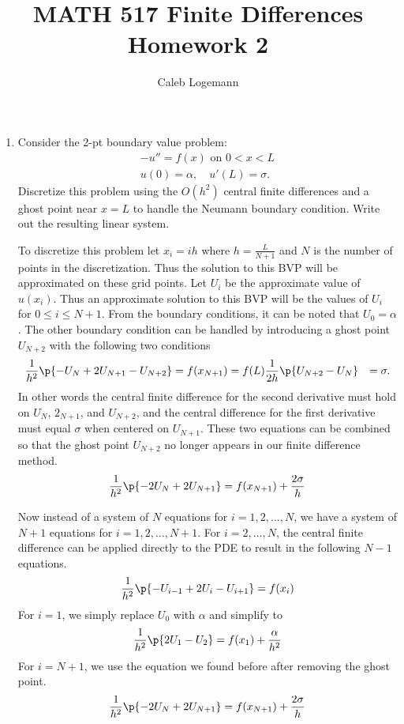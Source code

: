 \documentclass[11pt, oneside, titlepage]{article}
\title{MATH 517 Finite Differences Homework 2}
\author{Caleb Logemann}
\begin{document}
\maketitle

%
\begin{enumerate}
    \item %
        Consider the 2-pt boundary value problem:
        \begin{align*}
            -u'' = f(x)\text{ on } 0 < x < L \\
            u(0) = \alpha, \quad u'(L) = \sigma.
        \end{align*}
        Discretize this problem using the $O(h^2)$ central finite differences
        and a ghost point near $x = L$ to handle the Neumann boundary condition.
        Write out the resulting linear system.

        To discretize this problem let $x_i = ih$ where $h = \frac{L}{N + 1}$
        and $N$ is the number of points in the discretization.
        Thus the solution to this BVP will be approximated on these grid points.
        Let $U_i$ be the approximate value of $u(x_i)$.
        Thus an approximate solution to this BVP will be the values of $U_i$ for
        $0 \le i \le N+1$.
        From the boundary conditions, it can be noted that $U_0 = \alpha$.
        The other boundary condition can be handled by introducing a ghost point
        $U_{N+2}$ with the following two conditions
        \begin{align*}
            \frac{1}{h^2}\p{-U_{N} + 2U_{N+1} - U_{N+2}} &= f(x_{N+1}) = f(L)
            \frac{1}{2h} \p{U_{N+2} - U_{N}} &= \sigma. \\
        \end{align*}
        In other words the central finite difference for the second derivative
        must hold on $U_{N}$, $2_{N+1}$, and $U_{N+2}$, and the central
        difference for the first derivative must equal $\sigma$ when centered
        on $U_{N+1}$.
        These two equations can be combined so that the ghost point $U_{N+2}$
        no longer appears in our finite difference method.
        \[
            \frac{1}{h^2}\p{-2U_N + 2U_{N+1}} = f(x_{N+1}) + \frac{2\sigma}{h}
        \]

        Now instead of a system of $N$ equations for $i = 1, 2, \ldots, N$,
        we have a system of $N+1$ equations for $i = 1, 2, \ldots, N+1$.
        For $i = 2, \ldots, N$, the central finite difference can be applied
        directly to the PDE to result in the following $N-1$ equations.
        \[
            \frac{1}{h^2}\p{-U_{i-1} + 2U_{i} - U_{i+1}} = f(x_i)
        \]
        For $i = 1$, we simply replace $U_0$ with $\alpha$ and simplify to
        \[
            \frac{1}{h^2}\p{2U_{1} - U_{2}} = f(x_1) + \frac{\alpha}{h^2}
        \]
        For $i = N + 1$, we use the equation we found before after removing
        the ghost point.
        \[
            \frac{1}{h^2}\p{-2U_N + 2U_{N+1}} = f(x_{N+1}) + \frac{2\sigma}{h}
        \]


\end{enumerate}
\end{document}
